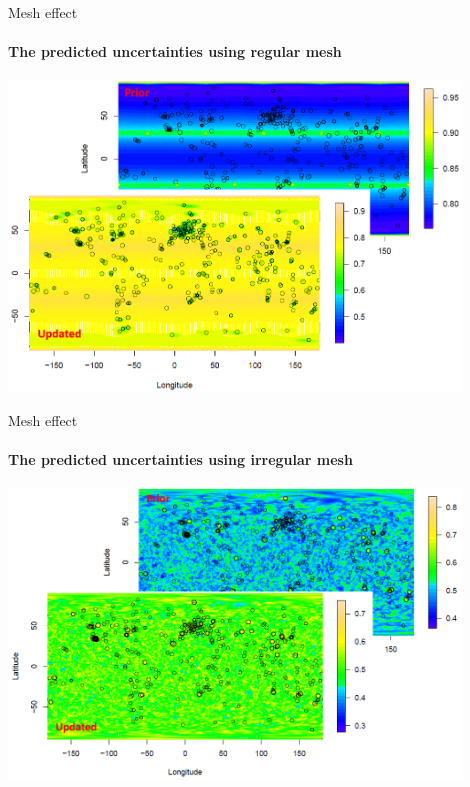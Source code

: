 \documentclass{beamer}
\begin{document}
\begin{frame}{Mesh effect}
\framesubtitle{The predicted uncertainties using regular mesh}

\vspace{0.7cm}
\centering
\includegraphics[width = 0.9\textwidth]{images/reg_var}
\end{frame}

\begin{frame}{Mesh effect}
\framesubtitle{The predicted uncertainties using irregular mesh}

\vspace{0.7cm}
\centering
\includegraphics[width = 0.9\textwidth]{images/irreg_var}
\end{frame}

\end{document}
